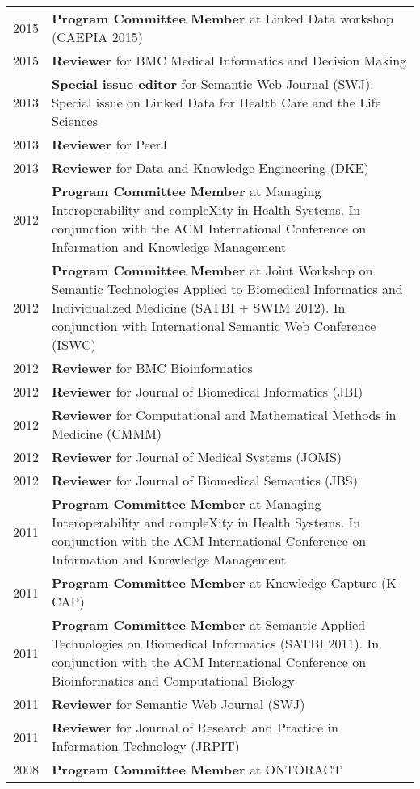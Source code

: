 \documentclass[11pt,fullpage]{article}
\begin{document}
\begin{longtable}{p{0.5in}|p{5.5in}}

2015 & \textbf{Program Committee Member} at Linked Data workshop (CAEPIA 2015) \\
2015  & \textbf{Reviewer} for BMC Medical Informatics and Decision Making \\
2013 & {\bf Special issue editor} for Semantic Web Journal (SWJ): Special issue on Linked Data for Health Care and the Life Sciences \\
2013  & \textbf{Reviewer} for PeerJ \\
2013  & \textbf{Reviewer} for Data and Knowledge Engineering (DKE) \\

2012 & \textbf{Program Committee Member} at Managing Interoperability and compleXity in Health Systems. In conjunction with the ACM International Conference on Information and Knowledge Management\\
2012 & \textbf{Program Committee Member} at Joint Workshop on Semantic Technologies Applied to Biomedical Informatics and Individualized Medicine (SATBI + SWIM 2012). In conjunction with International Semantic Web Conference (ISWC)\\
2012  & \textbf{Reviewer} for BMC Bioinformatics \\
2012  & \textbf{Reviewer} for Journal of Biomedical Informatics (JBI) \\
2012  & \textbf{Reviewer} for Computational and Mathematical Methods in Medicine (CMMM) \\
2012  & \textbf{Reviewer} for Journal of Medical Systems (JOMS) \\
2012  & \textbf{Reviewer} for Journal of Biomedical Semantics (JBS) \\
2011 & \textbf{Program Committee Member} at Managing Interoperability and compleXity in Health Systems. In conjunction with the ACM International Conference on Information and Knowledge Management\\
2011 & \textbf{Program Committee Member} at Knowledge Capture (K-CAP)\\
2011 & \textbf{Program Committee Member} at Semantic Applied Technologies on Biomedical Informatics (SATBI 2011). In conjunction with the ACM International Conference on Bioinformatics and Computational Biology\\
2011  & \textbf{Reviewer} for Semantic Web Journal (SWJ) \\
2011  & \textbf{Reviewer} for Journal of Research and Practice in Information Technology (JRPIT)\\
2008 & \textbf{Program Committee Member} at ONTORACT \\

\end{longtable}
\end{document}

